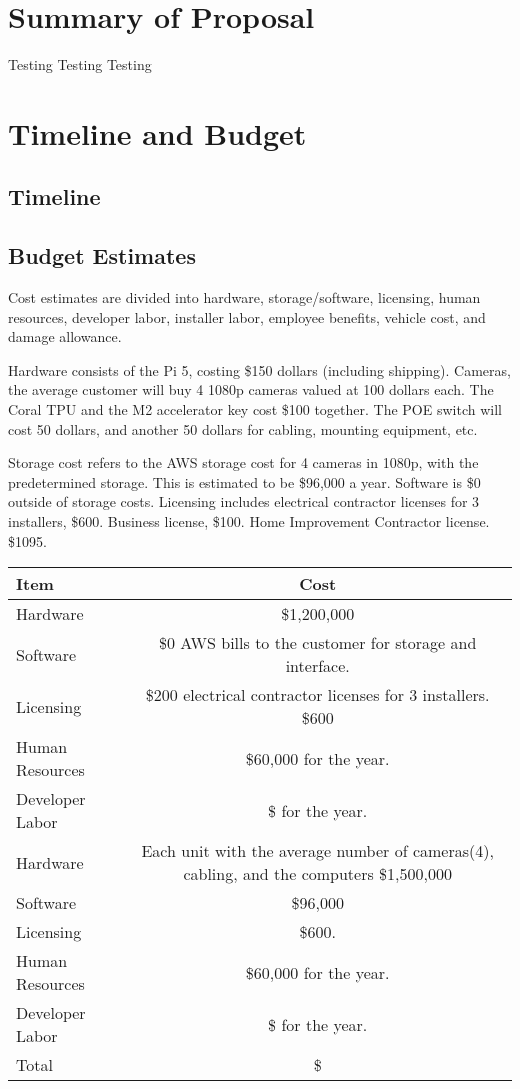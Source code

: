 \documentclass{report}
\begin{document}
\chapter{Summary of Proposal}
Testing Testing Testing

\chapter{Timeline and Budget}
\section{Timeline}

\section{Budget Estimates}
Cost estimates are divided into hardware, 
storage/software, licensing, human resources,
developer labor, installer labor, employee benefits, 
vehicle cost, and damage allowance.

Hardware consists of the Pi 5, costing \$150 dollars (including shipping). Cameras, 
the average customer will buy 4 1080p cameras valued at 100 dollars each. 
The Coral TPU and the M2 accelerator key cost \$100 together.
The POE switch will cost 50 dollars, and another 50 dollars for cabling, mounting equipment, etc.

Storage cost refers to the AWS storage cost for 4 cameras in 1080p, with the predetermined storage. This is estimated to be \$96,000 a year.
Software is \$0 outside of storage costs.
Licensing includes electrical contractor licenses for 3 installers, \$600. Business license, \$100. 
Home Improvement Contractor license. \$1095.
\begin{tabular}{|l|c|}
\hline
Item & Cost \\
\hline
Hardware & \$1,200,000 \\
Software & \$0 AWS bills to the customer for storage and interface. \\
Licensing & \$200 electrical contractor licenses for 3 installers. \$600 \\
Human Resources & \$60,000 for the year. \\
Developer Labor & \$ for the year. \\
Hardware & Each unit with the average number of cameras(4),
cabling, and the computers \$1,500,000\\
Software & \$96,000\\
Licensing & \$600. \\
Human Resources & \$60,000 for the year.\\
Developer Labor & \$ for the year.\\
\hline
Total & \$ \\
\hline
\end{tabular}
\end{document}
